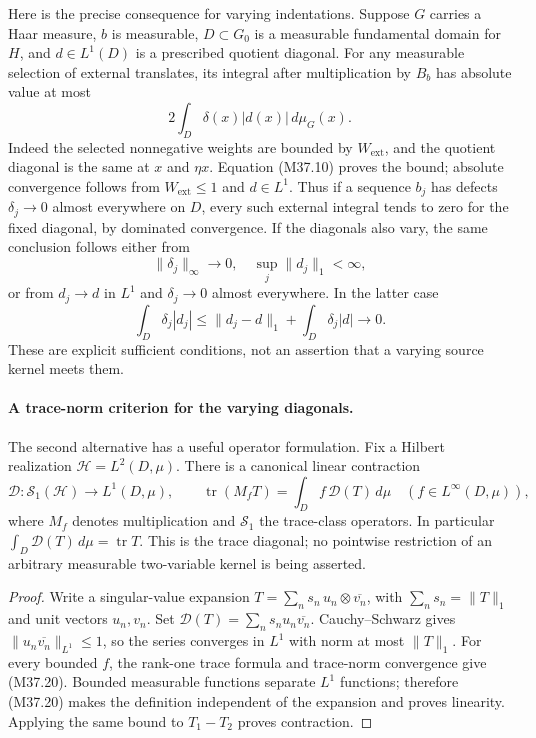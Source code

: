 Here is the precise consequence for varying indentations.
Suppose $G$ carries a Haar measure, $b$ is measurable,
$D\subset G_0$ is a
measurable fundamental domain for $H$, and
$d\in L^1(D)$ is a prescribed quotient diagonal.
For any measurable selection of external translates,
its integral after multiplication by $B_b$ has absolute
value at most
\[
                    2\int_D\delta(x)|d(x)|\,d\mu_G(x).
 \tag{M37.14}
\]
Indeed the selected nonnegative weights are bounded by
$W_{\mathrm{ext}}$, and the quotient diagonal is the
same at $x$ and $\eta x$.  Equation (M37.10) proves
the bound; absolute convergence follows from
$W_{\mathrm{ext}}\le1$ and $d\in L^1$.
Thus if a sequence $b_j$ has defects $\delta_j\to0$
almost everywhere on $D$, every such external integral
tends to zero for the fixed diagonal, by dominated
convergence.  If the diagonals also vary, the same
conclusion follows either from
\[
       \|\delta_j\|_\infty\to0,\quad
                       \sup_j\|d_j\|_1<\infty,
 \tag{M37.15}
\]
or from $d_j\to d$ in $L^1$ and
$\delta_j\to0$ almost everywhere.  In the latter case
\[
 \int_D\delta_j|d_j|
       \le\|d_j-d\|_1+\int_D\delta_j|d|\longrightarrow0.
 \tag{M37.16}
\]
These are explicit sufficient conditions, not an
assertion that a varying source kernel meets them.

\paragraph{A trace-norm criterion for the varying diagonals.}
The second alternative has a useful operator formulation.
Fix a Hilbert realization $\mathcal H=L^2(D,\mu)$.
There is a canonical linear contraction
\[
 \mathcal D:\mathcal S_1(\mathcal H)\longrightarrow L^1(D,\mu),
 \qquad
 \operatorname{tr}(M_fT)=\int_D f\,\mathcal D(T)\,d\mu
                   \quad(f\in L^\infty(D,\mu)),
 \tag{M37.20}
\]
where $M_f$ denotes multiplication and $\mathcal S_1$ the
trace-class operators.  In particular
$\int_D\mathcal D(T)\,d\mu=\operatorname{tr}T$.
This is the trace diagonal; no pointwise restriction of an
arbitrary measurable two-variable kernel is being asserted.

\begin{proof}
Write a singular-value expansion
$T=\sum_n s_n\,u_n\otimes\overline{v_n}$, with
$\sum_n s_n=\|T\|_1$ and unit vectors $u_n,v_n$.
Set $\mathcal D(T)=\sum_n s_nu_n\overline{v_n}$.
Cauchy--Schwarz gives
$\|u_n\overline{v_n}\|_{L^1}\le1$, so the series converges
in $L^1$ with norm at most $\|T\|_1$.
For every bounded $f$, the rank-one trace formula and
trace-norm convergence give (M37.20).
Bounded measurable functions separate $L^1$ functions;
therefore (M37.20) makes the definition independent of
the expansion and proves linearity.  Applying the same
bound to $T_1-T_2$ proves contraction.
\end{proof}

